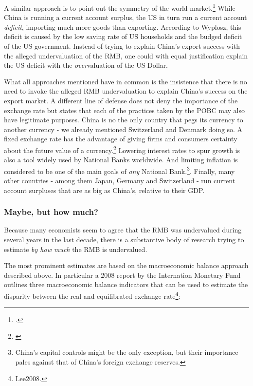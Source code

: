 A similar approach is to point out the symmetry of the world market.\footnote{\cite[pp. 39-40]{Wyplosz2010}.} While China is running a current account surplus, the US in turn run a current account \emph{deficit}, importing much more goods than exporting. According to Wyplosz, this deficit is caused by the low saving rate of US households and the budged deficit of the US government. Instead of trying to explain China's export success with the alleged undervaluation of the RMB, one could with equal justification explain the US deficit with the \emph{over}valuation of the US Dollar. 

What all approaches mentioned have in common is the insistence that there is no need to invoke the alleged RMB undervaluation to explain China's success on the export market. A different line of defense does not deny the importance of the exchange rate but states that each of the practices taken by the POBC may also have legitimate purposes. China is no the only country that pegs its currency to another currency - we already mentioned Switzerland and Denmark doing so. A fixed exchange rate has the advantage of giving firms and consumers certainty about the future value of a currency.\footnote{\cite[p. 515]{Krugman2008}} Lowering interest rates to spur growth is also a tool widely used by National Banks worldwide. And limiting inflation is considered to be one of the main goals of \emph{any} National Bank.\footnote{China's capital controls might be the only exception, but their importance pales against that of China's foreign exchange reserves.}. Finally, many other countries - among them Japan, Germany and Switzerland - run current account surpluses that are as big as China's, relative to their GDP.


\subsubsection{Maybe, but how much?}

Because many economists seem to agree that the RMB was undervalued during several years in the last decade, there is a substantive body of research trying to estimate \emph{by how much} the RMB is undervalued.

The most prominent estimates are based on the macroeconomic balance approach described above. In particular a 2008 report by the 
Internation Monetary Fund outlines three macroeconomic balance indicators that can be used to 
estimate the disparity between the real and equilibrated exchange 
rate\footnote{\cite{pp. 1}{Lee2008}.}:

